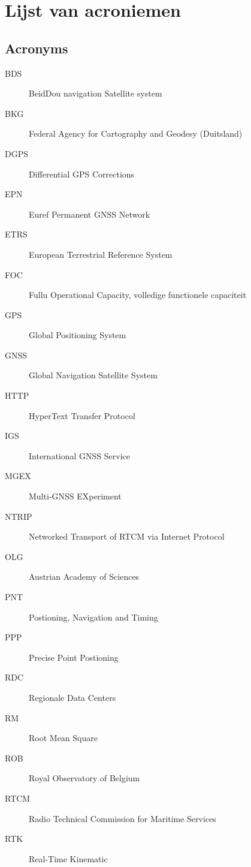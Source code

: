 \chapter*{Lijst van acroniemen}

\section*{Acronyms}
\begin{description}
	\item[BDS] BeidDou navigation Satellite system
	\item[BKG] Federal Agency for Cartography and Geodesy (Duitsland)
	\item[DGPS] Differential GPS Corrections
	\item[EPN] Euref Permanent GNSS Network
	\item[ETRS] European Terrestrial Reference System
	\item[FOC] Fullu Operational Capacity, volledige functionele capaciteit
	\item[GPS] Global Positioning System
	\item[GNSS] Global Navigation Satellite System
	\item[HTTP] HyperText Transfer Protocol
	\item[IGS] International GNSS Service
	\item[MGEX] Multi-GNSS EXperiment
	\item[NTRIP] Networked Transport of RTCM via Internet Protocol
	\item[OLG] Austrian Academy of Sciences
	\item[PNT] Postioning, Navigation and Timing
	\item[PPP] Precise Point Postioning
	\item[RDC] Regionale Data Centers
	\item[RM] Root Mean Square
	\item[ROB] Royal Observatory of Belgium
	\item[RTCM] Radio Technical Commission for Maritime Services
	\item [RTK] Real-Time Kinematic
\end{description}

